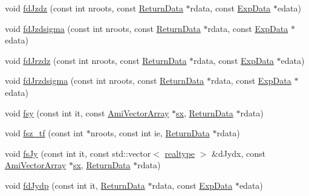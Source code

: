 \begin{DoxyCompactItemize}
\item 
void \mbox{\hyperlink{classamici_1_1_model_a2506c3b5baa2f4de9236df5ca443c19a}{fd\+Jzdz}} (const int nroots, const \mbox{\hyperlink{classamici_1_1_return_data}{Return\+Data}} $\ast$rdata, const \mbox{\hyperlink{classamici_1_1_exp_data}{Exp\+Data}} $\ast$edata)
\item 
void \mbox{\hyperlink{classamici_1_1_model_ab4e0c14948c6af3b5c877f30f0100954}{fd\+Jzdsigma}} (const int nroots, const \mbox{\hyperlink{classamici_1_1_return_data}{Return\+Data}} $\ast$rdata, const \mbox{\hyperlink{classamici_1_1_exp_data}{Exp\+Data}} $\ast$edata)
\item 
void \mbox{\hyperlink{classamici_1_1_model_ac3f8bf431f374d77ba9190a460043009}{fd\+Jrzdz}} (const int nroots, const \mbox{\hyperlink{classamici_1_1_return_data}{Return\+Data}} $\ast$rdata, const \mbox{\hyperlink{classamici_1_1_exp_data}{Exp\+Data}} $\ast$edata)
\item 
void \mbox{\hyperlink{classamici_1_1_model_a3e6a11cdaa35b6e85d013eb9f63564d2}{fd\+Jrzdsigma}} (const int nroots, const \mbox{\hyperlink{classamici_1_1_return_data}{Return\+Data}} $\ast$rdata, const \mbox{\hyperlink{classamici_1_1_exp_data}{Exp\+Data}} $\ast$edata)
\item 
void \mbox{\hyperlink{classamici_1_1_model_a9469743e91fe7a63974ba2ac58a50396}{fsy}} (const int it, const \mbox{\hyperlink{classamici_1_1_ami_vector_array}{Ami\+Vector\+Array}} $\ast$\mbox{\hyperlink{classamici_1_1_model_ac3288cc7f649605938f1fd1b459d3d8c}{sx}}, \mbox{\hyperlink{classamici_1_1_return_data}{Return\+Data}} $\ast$rdata)
\item 
void \mbox{\hyperlink{classamici_1_1_model_a6c533c9b3476d81336d1758a817d0746}{fsz\+\_\+tf}} (const int $\ast$nroots, const int ie, \mbox{\hyperlink{classamici_1_1_return_data}{Return\+Data}} $\ast$rdata)
\item 
void \mbox{\hyperlink{classamici_1_1_model_accad5c6b805db97a0066842883e9a750}{fs\+Jy}} (const int it, const std\+::vector$<$ \mbox{\hyperlink{namespaceamici_a1bdce28051d6a53868f7ccbf5f2c14a3}{realtype}} $>$ \&d\+Jydx, const \mbox{\hyperlink{classamici_1_1_ami_vector_array}{Ami\+Vector\+Array}} $\ast$\mbox{\hyperlink{classamici_1_1_model_ac3288cc7f649605938f1fd1b459d3d8c}{sx}}, \mbox{\hyperlink{classamici_1_1_return_data}{Return\+Data}} $\ast$rdata)
\item 
void \mbox{\hyperlink{classamici_1_1_model_a55cd85ac6c2a9a85c3b1eb482cb62c2f}{fd\+Jydp}} (const int it, \mbox{\hyperlink{classamici_1_1_return_data}{Return\+Data}} $\ast$rdata, const \mbox{\hyperlink{classamici_1_1_exp_data}{Exp\+Data}} $\ast$edata)

\end{DoxyCompactItemize}
